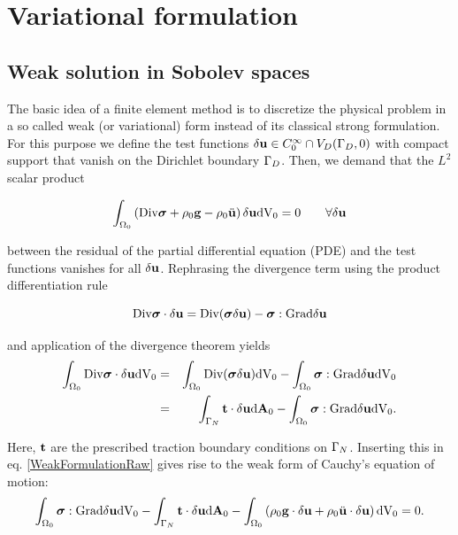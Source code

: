 \section{Variational formulation}

\subsection{Weak solution in Sobolev spaces}

\label{SubSectionWeakSolutions}
The basic idea of a finite element method is to discretize the physical problem in a so called weak (or variational) form instead of its classical strong formulation. For this purpose we define the test functions $\delta \mathbf {u}  \in {C}_0 ^{\infty} \cap V_D(\Gamma _D,0)$ with compact support that vanish on the Dirichlet boundary $\Gamma _D$. Then, we demand that the $L^2$ scalar product 

 \begin{equation}
\int _{\Omega _0}  \left(  \textnormal{Div} \boldsymbol{\sigma} +    \rho _0 \mathbf {g}   -  \rho _0 \ddot {\mathbf {u} } \right) \delta \mathbf {u}  \textnormal{dV}_0  = 0 \qquad \forall \delta \mathbf {u} 
\label{WeakFormulationRaw}
\end{equation}

between the residual of the partial differential equation (PDE) and the test functions vanishes for all $\delta \mathbf {u} $. Rephrasing the divergence term using the product differentiation rule


 \begin{equation}
  \textnormal{Div} \boldsymbol{\sigma} \cdot \delta \mathbf {u}  =  \textnormal{Div} ( \boldsymbol{\sigma}  \delta \mathbf {u} ) - \boldsymbol{\sigma} :  \textnormal{Grad} \delta \mathbf {u} 
\end{equation}

and application of the divergence theorem yields
\begin{eqnarray}
\int _{\Omega _0}     \textnormal{Div} \boldsymbol{\sigma} \cdot \delta \mathbf {u}  \textnormal{dV}_0  &=& \int _{\Omega _0}   \textnormal{Div} ( \boldsymbol{\sigma}  \delta \mathbf {u} ) \textnormal{dV}_0   - \int _{\Omega _0}    \boldsymbol{\sigma} :  \textnormal{Grad} \delta \mathbf {u}  \textnormal{dV}_0  \\
&=& \int _{\Gamma _N}  \mathbf {t}  \cdot \delta \mathbf {u}   \textnormal{d}\mathbf{A}_0  - \int _{\Omega _0}   \boldsymbol{\sigma} :  \textnormal{Grad} \delta \mathbf {u}  \textnormal{dV}_0 .
\label{ApplicationsDivTheorem}
\end{eqnarray}

Here, $\mathbf {t} $ are the prescribed traction boundary conditions on $\Gamma _N$. Inserting this in eq. \ref{WeakFormulationRaw} gives rise to the weak form of Cauchy's equation of motion:
\begin{equation}
\int _{\Omega _0}  \boldsymbol{\sigma} :  \textnormal{Grad} \delta \mathbf {u} \textnormal{dV}_0  - \int _{\Gamma _N}  \mathbf {t}  \cdot \delta \mathbf {u}   \textnormal{d}\mathbf{A}_0 - \int _{\Omega _0}  \left( \rho _0 \mathbf {g}   \cdot \delta \mathbf {u}   +  \rho _0 \ddot {\mathbf {u} } \cdot \delta \mathbf {u}  \right) \textnormal{dV}_0  = 0.
\label{WeakFormulation}
\end{equation}

